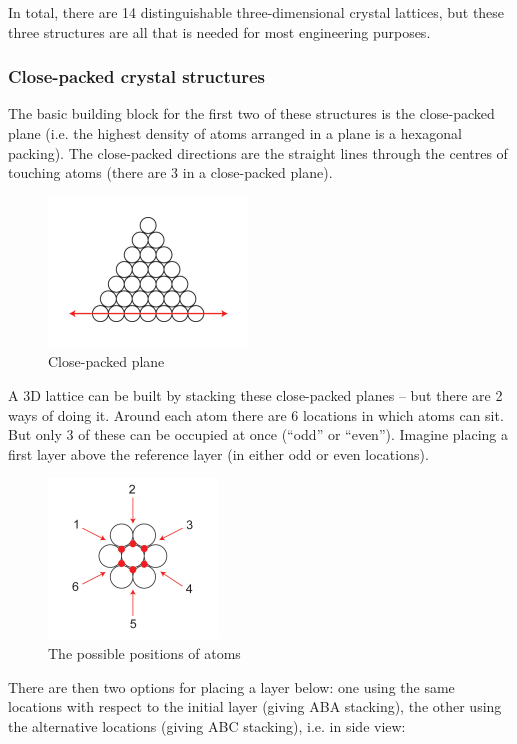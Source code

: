 \documentclass{article}
\begin{document}
In total, there are 14 distinguishable three-dimensional crystal lattices, but these three structures are all that is needed for most engineering purposes.

\subsubsection{Close-packed crystal structures}

The basic building block for the first two of these structures is the
close-packed plane (i.e. the highest density of atoms arranged in a
plane is a hexagonal packing).
The close-packed directions are the straight lines through the centres
of touching atoms (there are 3 in a close-packed plane).

\begin{figure}[h]
    \centering
    \includegraphics{images/mat1.png}
    \caption{Close-packed plane}
    \label{fig:enter-label}
\end{figure}

A 3D lattice can be built by stacking these close-packed planes – but there are 2 ways of doing it.
Around each atom there are 6 locations in which atoms can sit.
But only 3 of these can be occupied at once (“odd” or “even”).
Imagine placing a first layer above the reference layer (in either odd
or even locations). 

\begin{figure}[h]
    \centering
    \includegraphics{images/mat2.png}
    \caption{The possible positions of atoms}
    \label{fig:enter-label}
\end{figure}

There are then two options for placing a layer
below: one using the same locations with respect to the initial layer
(giving ABA stacking), the other using the alternative locations
(giving ABC stacking), i.e. in side view:
\end{document}
